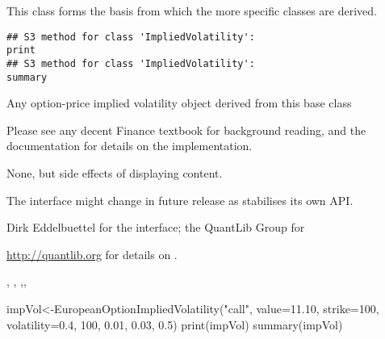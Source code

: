 \begin{Description}\relax
This class forms the basis from which the more specific classes are
derived.
\end{Description}
\begin{Usage}
\begin{verbatim}
## S3 method for class 'ImpliedVolatility':
print
## S3 method for class 'ImpliedVolatility':
summary
\end{verbatim}
\end{Usage}
\begin{Arguments}
\begin{ldescription}
\item[\code{}] 
\end{ldescription}
{Any option-price implied volatility object derived
from this base class}
\end{Arguments}
\begin{Details}\relax
Please see any decent Finance textbook for background reading, and the
 documentation for details on the 
implementation.
\end{Details}
\begin{Value}
None, but side effects of displaying content.
\end{Value}
\begin{Note}\relax
The interface might change in future release as 
stabilises its own API.
\end{Note}
\begin{Author}\relax
Dirk Eddelbuettel  for the \R{} interface;
the QuantLib Group for 
\end{Author}
\begin{References}\relax
\url{http://quantlib.org} for details on .
\end{References}
\begin{SeeAlso}\relax
{},
,
,,
\end{SeeAlso}
\begin{Examples}
\begin{ExampleCode}
impVol<-EuropeanOptionImpliedVolatility("call", value=11.10, strike=100, volatility=0.4, 100, 0.01, 0.03, 0.5)
print(impVol)
summary(impVol)
\end{ExampleCode}
\end{Examples}

